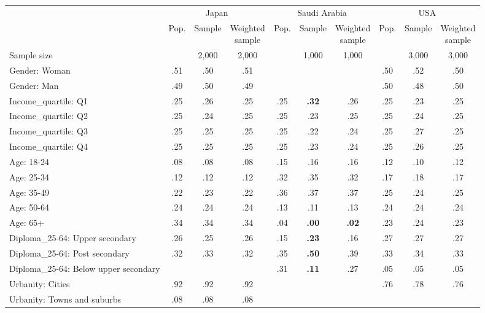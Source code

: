 
\begin{tabular}[t]{lccccccccc}
\toprule
\multicolumn{1}{c}{} & \multicolumn{3}{c}{Japan} & \multicolumn{3}{c}{Saudi Arabia} & \multicolumn{3}{c}{USA} \\
\cmidrule(l{3pt}r{3pt}){2-4} \cmidrule(l{3pt}r{3pt}){5-7} \cmidrule(l{3pt}r{3pt}){8-10}
  & Pop. & Sample & \makecell{Weighted\\sample} & Pop. & Sample & \makecell{Weighted\\sample} & Pop. & Sample & \makecell{Weighted\\sample}\\
\midrule
Sample size &  & 2,000 & 2,000 &  & 1,000 & 1,000 &  & 3,000 & 3,000\\
\addlinespace
Gender: Woman & .51 & .50 & .51 &  &  &  & .50 & .52 & .50\\
Gender: Man & .49 & .50 & .49 &  &  &  & .50 & .48 & .50\\
\addlinespace
Income\_quartile: Q1 & .25 & .26 & .25 & .25 & \textbf{.32} & .26 & .25 & .23 & .25\\
Income\_quartile: Q2 & .25 & .24 & .25 & .25 & .23 & .25 & .25 & .24 & .25\\
Income\_quartile: Q3 & .25 & .25 & .25 & .25 & .22 & .24 & .25 & .27 & .25\\
Income\_quartile: Q4 & .25 & .25 & .25 & .25 & .23 & .24 & .25 & .26 & .25\\
\addlinespace
Age: 18-24 & .08 & .08 & .08 & .15 & .16 & .16 & .12 & .10 & .12\\
Age: 25-34 & .12 & .12 & .12 & .32 & .35 & .32 & .17 & .18 & .17\\
Age: 35-49 & .22 & .23 & .22 & .36 & .37 & .37 & .25 & .24 & .25\\
Age: 50-64 & .24 & .24 & .24 & .13 & .11 & .13 & .24 & .24 & .24\\
Age: 65+ & .34 & .34 & .34 & .04 & \textbf{.00} & \textbf{.02} & .23 & .24 & .23\\
\addlinespace
Diploma\_25-64: Upper secondary & .26 & .25 & .26 & .15 & \textbf{.23} & .16 & .27 & .27 & .27\\
Diploma\_25-64: Post secondary & .32 & .33 & .32 & .35 & \textbf{.50} & .39 & .33 & .34 & .33\\
Diploma\_25-64: Below upper secondary &  &  &  & .31 & \textbf{.11} & .27 & .05 & .05 & .05\\
\addlinespace
Urbanity: Cities & .92 & .92 & .92 &  &  &  & .76 & .78 & .76\\
Urbanity: Towns and suburbs & .08 & .08 & .08 &  &  &  &  &  & \\

\end{tabular}
